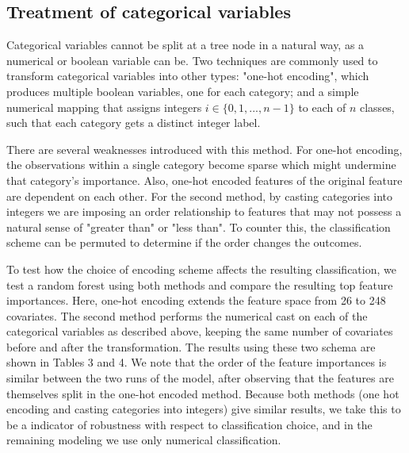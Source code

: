 \subsection{Treatment of categorical variables}
Categorical variables cannot be split at a tree node in a natural way, as a numerical or boolean variable can be. Two techniques are commonly used to transform categorical variables into other types: "one-hot encoding", which produces multiple boolean variables, one for each category; and a simple numerical mapping that assigns integers $i \in \{0, 1, ..., n-1\}$ to each of $n$ classes, such that each category gets a distinct integer label.

There are several weaknesses introduced with this method. For one-hot encoding, the observations within a single category become sparse which might undermine that category's importance. Also, one-hot encoded features of the original feature are dependent on each other. For the second method, by casting categories into integers we are imposing an order relationship to features that may not possess a natural sense of "greater than" or "less than". To counter this, the classification scheme can be permuted to determine if the order changes the outcomes.

To test how the choice of encoding scheme affects the resulting classification, we test a random forest using both methods and compare the resulting top feature importances. Here, one-hot encoding extends the feature space from 26 to 248 covariates. The second method performs the numerical cast on each of the categorical variables as described above, keeping the same number of covariates before and after the transformation. The results using these two schema are shown in Tables 3 and 4. We note that the order of the feature importances is similar between the two runs of the model, after observing that the features are themselves split in the one-hot encoded method. Because both methods (one hot encoding and casting categories into integers) give similar results, we take this to be a indicator of robustness with respect to classification choice, and in the remaining modeling we use only numerical classification.